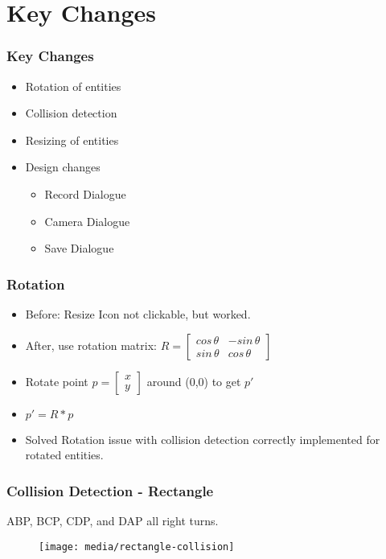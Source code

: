 

\section{Key Changes}
\begin{frame}
	\frametitle{Key Changes}
	\begin{itemize}
		\item Rotation of entities
		\item Collision detection
		\item Resizing of entities
		\item Design changes
		\begin{itemize}
			\item Record Dialogue
			\item Camera Dialogue
			\item Save Dialogue
		\end{itemize}
	\end{itemize}
\end{frame}

\begin{frame}
	\frametitle{Rotation}
	\begin{itemize}
	\item Before: Resize Icon not clickable, but worked.
	\item After, use rotation matrix: $R = \begin{bmatrix}
			cos\, \theta & - sin\, \theta\\
			sin\, \theta & cos\, \theta
			\end{bmatrix}$
	\item Rotate point $p = \begin{bmatrix}x\\y\end{bmatrix}$ around (0,0) to get $p'$
	\item $p' = R*p$
	\item Solved Rotation issue with collision detection correctly implemented for rotated entities.
	\end{itemize}
\end{frame}



\begin{frame}
	\frametitle{Collision Detection - Rectangle}
	ABP, BCP, CDP, and DAP all right turns.
		\begin{figure}
		\centering
			\texttt{[image: media/rectangle-collision]}
		\end{figure}
\end{frame}

